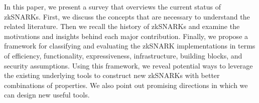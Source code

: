 \documentclass[acmlarge]{acmart}
\theoremstyle{plain}
\theoremstyle{definition}
\theoremstyle{remark}
\begin{document}
In this paper, we present a survey that overviews the current status of zkSNARKs.
First, we discuss the concepts that are necessary to understand the related literature.
Then we recall the history of zkSNARKs and examine the motivations and insights behind each major contribution.
Finally, we propose a framework for classifying and evaluating the zkSNARK implementations in terms of efficiency, functionality, expressiveness, infrastructure, building blocks, and security assumptions.
Using this framework, we reveal potential ways to leverage the existing underlying tools to construct new zkSNARKs with better combinations of properties.
We also point out promising directions in which we can design new useful tools.



\end{document}
